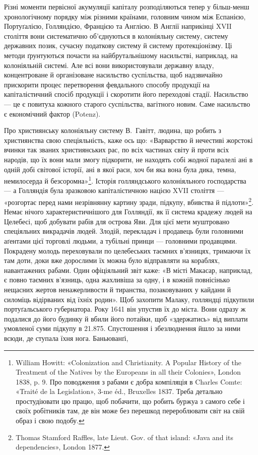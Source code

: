 
Різні моменти первісної акумуляції капіталу розподіляються
тепер у більш-менш хронологічному порядку між різними країнами,
головним чином між Еспанією, Портуґалією, Голляндією,
Францією та Англією. В Англії наприкінці XVII століття вони
систематично об’єднуються в колоніяльну систему, систему державних
позик, сучасну податкову систему й систему протекціонізму.
Ці методи ґрунтуються почасти на найбрутальнішому
насильстві, наприклад, на колоніяльній системі. Але всі вони
використовували державну владу, концентроване й організоване
насильство суспільства, щоб надзвичайно прискорити процес
перетворення февдального способу продукції на капіталістичний
спосіб продукції і скоротити його переходові стадії. Насильство —
це є повитуха кожного старого суспільства, вагітного новим.
Саме насильство є економічний фактор (Potenz).

Про християнську колоніяльну систему В.~Гавітт, людина,
що робить з християнства свою спеціяльність, каже ось що:
«Варварство й нечестиві жорстокі вчинки так званих християнських
рас, по всіх частинах світу й проти всіх народів, що їх
вони мали змогу підкорити, не находять собі жодної паралелі
ані в одній добі світової історії, ані в якої раси, хоч би яка вона
була дика, темна, немилосерда й безсоромна»\footnote{
William Howitt: «Colonization and Christianity. A Popular History
of the Treatment of the Natives by the Europeans in all their Colonies»,
London 1838, p. 9. Про поводження з рабами є добра компіляція в Charles
Comte: «Traité de la Legislation», 3-me éd., Bruxelles 1837. Треба детально
простудіювати цю працю, щоб побачити, що робить буржуа з
самого себе і своїх робітників там, де він може без перешкод перероблювати
світ на свій образ і свою подобу.
}. Історія голляндського
колоніяльного господарства — а Голляндія була
зразковою капіталістичною нацією XVII століття — «розгортає
перед нами незрівнянну картину зради, підкупу, вбивства
й підлоти»\footnote{
Thomas Stamford Raffles, late Lieut. Gov. of that island: «Java
and its dependencies», London 1877.
}. Немає нічого характеристичнішого для Голляндії,
як її система крадежу людей на Целебесі, щоб добувати рабів
для острова Яви. Для цієї мети муштровано спеціяльних викрадачів
людей. Злодій, перекладач і продавець були головними аґентами
цієї торговлі людьми, а тубільні принци — головними продавцями.
Покрадену молодь переховували по целебеських таємних в’язницях,
тримаючи їх там доти, доки вже дорослими їх можна було
відправляти на кораблях, навантажених рабами. Один офіціяльний
звіт каже: «В місті Макасар, наприклад, є повно таємних в’язниць,
одна жахливіша за одну, і в кожній повнісінько нещасних
жертов ненажерливости й тиранства, позаковуваних у кайдани
й силоміць відірваних від їхніх родин». Щоб захопити Малаку,
голляндці підкупили портуґальського губернатора. Року 1641
він упустив їх до міста. Вони одразу ж подалися до його будинку
й вбили його потайки, щоб «здержатись» від виплати умовленої
суми підкупу в \num{21.875}. Спустошення і збезлюднення
йшло за ними всюди, де ступала їхня нога. Баньюванґі,
\parbreak{}  %
